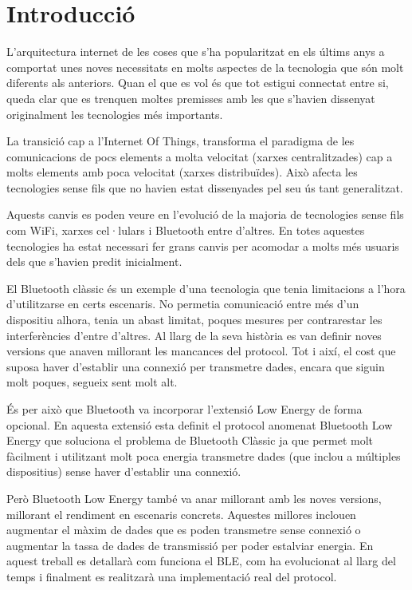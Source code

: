\cleardoublepage
{}
\chapter*{Introducció}
L'arquitectura internet de les coses que s'ha popularitzat en els últims anys a comportat unes noves necessitats en molts aspectes de la tecnologia que són molt diferents als anteriors.
Quan el que es vol és que tot estigui connectat entre si, queda clar que es trenquen moltes premisses amb les que s'havien dissenyat originalment les tecnologies més importants.

La transició cap a l'Internet Of Things, transforma el paradigma de les comunicacions de pocs elements a molta velocitat (xarxes centralitzades) cap a molts elements amb poca velocitat (xarxes distribuïdes).
Això afecta les tecnologies sense fils que no havien estat dissenyades pel seu ús tant generalitzat.

Aquests canvis es poden veure en l'evolució de la majoria de tecnologies sense fils com WiFi, xarxes cel·lulars i Bluetooth entre d'altres.
En totes aquestes tecnologies ha estat necessari fer grans canvis per acomodar a molts més usuaris dels que s'havien predit inicialment.

El Bluetooth clàssic és un exemple d'una tecnologia que tenia limitacions a l'hora d'utilitzarse en certs escenaris.
No permetia comunicació entre més d'un dispositiu alhora, tenia un abast limitat, poques mesures per contrarestar les interferències d'entre d'altres.
Al llarg de la seva història es van definir noves versions que anaven millorant les mancances del protocol.
Tot i així, el cost que suposa haver d'establir una connexió per transmetre dades, encara que siguin molt poques, segueix sent molt alt.

És per això que Bluetooth va incorporar l'extensió Low Energy de forma opcional.
En aquesta extensió esta definit el protocol anomenat Bluetooth Low Energy que soluciona el problema de Bluetooth Clàssic ja que permet molt fàcilment i utilitzant molt poca energia transmetre dades (que inclou a múltiples dispositius) sense haver d'establir una connexió.

Però Bluetooth Low Energy també va anar millorant amb les noves versions, millorant el rendiment en escenaris concrets.
Aquestes millores inclouen augmentar el màxim de dades que es poden transmetre sense connexió o augmentar la tassa de dades de transmissió per poder estalviar energia.
En aquest treball es detallarà com funciona el BLE, com ha evolucionat al llarg del temps i finalment es realitzarà una implementació real del protocol.